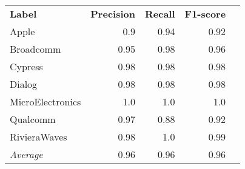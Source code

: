 \begin{tabular}{lrrrr}
    \textbf{Label} & \textbf{Precision} & \textbf{Recall} & \textbf{F1-score} \\
    Apple & 0.9 & 0.94 & 0.92 \\
    Broadcomm & 0.95 & 0.98 & 0.96 \\
    Cypress & 0.98 & 0.98 & 0.98 \\
    Dialog & 0.98 & 0.98 & 0.98 \\
    MicroElectronics & 1.0 & 1.0 & 1.0 \\
    Qualcomm & 0.97 & 0.88 & 0.92 \\
    RivieraWaves & 0.98 & 1.0 & 0.99 \\
    \emph{Average} & 0.96 & 0.96 & 0.96 \\
\end{tabular}